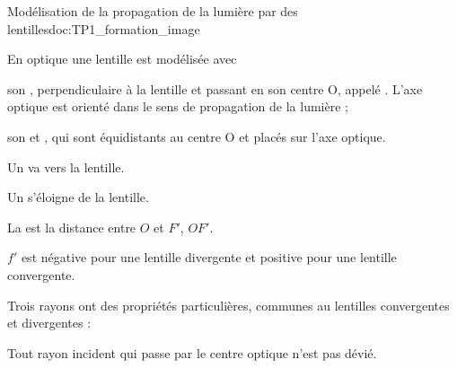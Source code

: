 \begin{doc}{Modélisation de la propagation de la lumière par des lentilles}{doc:TP1_formation_image}

  
  En optique une lentille est modélisée avec
  \begin{listePoints}
    \item son , perpendiculaire à la lentille et passant en son centre O, appelé . L'axe optique est orienté dans le sens de propagation de la lumière ;
    \item son  et , qui sont équidistants au centre O et placés sur l'axe optique.
  \end{listePoints}

  \begin{boite}
    \vspace{-4pt}
    \vspace{-8pt}
    \begin{importants}
      \begin{listePoints}
        \item Un  va vers la lentille.
        \item Un  s'éloigne de la lentille.
        \item La  est la distance entre $O$ et $F'$, $OF'$.
      \end{listePoints}
    \end{importants}
    \vspace{-4pt}
    
    $f'$ est négative pour une lentille divergente et positive pour une lentille convergente.
  \end{boite}    

  Trois rayons ont des propriétés particulières, communes au lentilles convergentes et divergentes :
  
  \begin{listePoints}
    \item Tout rayon incident qui passe par le centre optique n'est pas dévié.
    \begin{center}
    \end{center}
  

\end{listePoints}
\end{doc}
